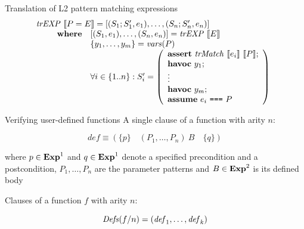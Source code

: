 \documentclass{beamer}
\begin{document}

  \begin{frame}{Translation of L2 pattern matching expressions}
    \[
      \begin{array}{l}
      \mathit{trEXP}~\llbracket P = E\rrbracket = [(S_1;S_1',e_1), \dots, (S_n;S_n', e_n)] \\
      \qquad 
      \begin{array}{ll}
      \textbf{where} & [(S_1,e_1),\dots,(S_n, e_n)] = \mathit{trEXP}~\llbracket E\rrbracket \\
      & \{y_1, \ldots, y_m\} = \mathit{vars}(P) \\
      & \forall i \in \{1..n\}: S_i' = \left(
      \begin{array}{l}
      \textbf{assert}~\mathit{trMatch}~\llbracket e_i\rrbracket~\llbracket P\rrbracket;\\
      \textbf{havoc}~y_1;\\
      \vdots\\
      \textbf{havoc}~y_m;\\
      \textbf{assume}~e_i ~\texttt{===}~ P\\
      \end{array}
      \right)
      \end{array}
      \end{array}
    \]
  \end{frame}
  \begin{frame}{Verifying user-defined functions}
    A single clause of a function with arity $n$:

    \[
    \mathit{def} \equiv \left(\{ p \}  \quad (P_1, \dots, P_n)~B \quad \{ q \} \right)
    \]

    \pause where $p \in \mathbf{Exp}^{1}$ and $q \in \mathbf{Exp}^{1}$ denote a specified precondition and a
    postcondition, $P_1, \dots, P_n$ are the parameter patterns and $B \in \mathbf{Exp}^{2}$
    is its defined body

    \pause \medskip

    Clauses of a function $f$ with arity $n$:

    \[
      \mathit{Defs}(f/n) = (\mathit{def}_1,\dots,\mathit{def}_k)
    \]
  \end{frame}
\end{document}
